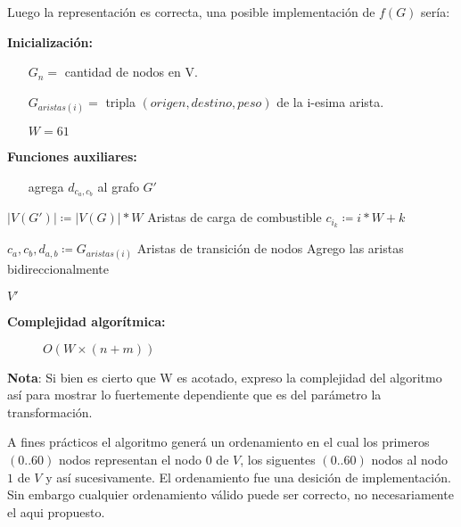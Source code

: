 \documentclass[12pt]{article}
\def\is{\coloneqq}
\begin{document}
Luego la representación es correcta, una posible implementación de $f(G)$ sería:

\begin{algorithm}[H]
	\caption{$f(G)$}
	\begin{algorithmic}[1]
		\item[\textbf{Inicialización:}]
		\item[] \begin{itemize}
			\item[] $G_n = $ cantidad de nodos en V.
			\item[] $G_{aristas(i)} = $ tripla $(origen, destino, peso)$ de la i-esima arista.
			\item[] $W = 61$
		\end{itemize}
		\item[\textbf{Funciones auxiliares:}]
		\item[] \begin{itemize}
			\item[]  agrega $d_{c_a,c_b}$ al grafo $G'$
		\end{itemize}
		\Statex
		\State $|V(G')| \is |V(G)| * W$
		\Comment Aristas de carga de combustible
		\State $c_{i_k} \is i * W + k$
		\State {}
		\EndFor
		\EndFor
		\State
		
		\State $c_a,c_b,d_{a,b} \is G_{aristas(i)}$
		\Comment Aristas de transición de nodos
		\Comment Agrego las aristas bidireccionalmente
		\State {}
		\State {}
		\EndIf
		\EndFor
		\EndFor
		
		\State \Return $V'$
		\EndFunction
	\end{algorithmic}
	\begin{description}
		\item[\textbf{Complejidad algorítmica:}] $O(W \times (n + m))$
	\end{description}
\end{algorithm}

\textbf{Nota}: Si bien es cierto que W es acotado, expreso la complejidad del algoritmo así para mostrar lo fuertemente dependiente que es del parámetro la transformación. 

A fines prácticos el algoritmo generá un ordenamiento en el cual los primeros $(0..60)$ nodos representan el nodo $0$ de $V$, los siguentes $(0..60)$ nodos al nodo $1$ de $V$ y así sucesivamente. El ordenamiento fue una desición de implementación. Sin embargo cualquier ordenamiento válido puede ser correcto, no necesariamente el aqui propuesto. 
\end{document}
